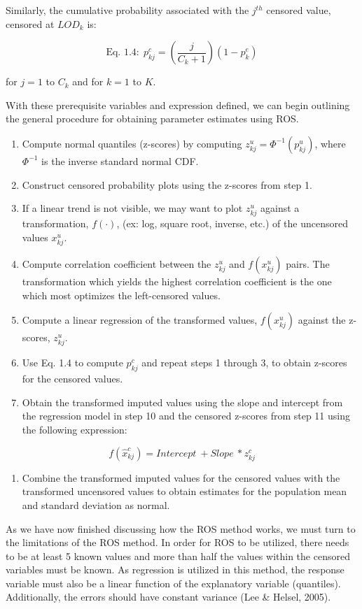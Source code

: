 \documentclass[12pt, twoside]{amherstthesis}
\providecommand{\tightlist}{%
  \setlength{\itemsep}{0pt}\setlength{\parskip}{0pt}}
\begin{document}
Similarly, the cumulative probability associated with the \(j^{th}\) censored value, censored at \(LOD_k\) is:

\[\textrm{Eq. 1.4:} \ \  p^c_{kj} = \left(\frac{j}{C_k+1}\right)(1-p^e_k)\]

for \(j = 1\) to \(C_k\) and for \(k = 1\) to \(K\).

With these prerequisite variables and expression defined, we can begin outlining the general procedure for obtaining parameter estimates using ROS.
\begin{enumerate}
\def\labelenumi{\arabic{enumi}.}
\item
  Compute normal quantiles (z-scores) by computing \(z_{kj}^{u} = \Phi^{-1}(p^u_{kj})\), where \(\Phi^{-1}\) is the inverse standard normal CDF.
\item
  Construct censored probability plots using the z-scores from step 1.
\item
  If a linear trend is not visible, we may want to plot \(z_{kj}^{u}\) against a transformation, \(f(\cdot)\), (ex: log, square root, inverse, etc.) of the uncensored values \(x_{kj}^{u}\).
\item
  Compute correlation coefficient between the \(z_{kj}^{u}\) and \(f(x_{kj}^{u})\) pairs. The transformation which yields the highest correlation coefficient is the one which most optimizes the left-censored values.
\item
  Compute a linear regression of the transformed values, \(f(x_{kj}^{u})\) against the z-scores, \(z_{kj}^{u}\).
\item
  Use Eq. 1.4 to compute \(p^c_{kj}\) and repeat steps 1 through 3, to obtain z-scores for the censored values.
\item
  Obtain the transformed imputed values using the slope and intercept from the regression model in step 10 and the censored z-scores from step 11 using the following expression:
\end{enumerate}
\[f(\hat{x}_{kj}^c) = {Intercept} \ + Slope \ * z_{kj}^{c}\]
\begin{enumerate}
\def\labelenumi{\arabic{enumi}.}
\setcounter{enumi}{7}
\tightlist
\item
  Combine the transformed imputed values for the censored values with the transformed uncensored values to obtain estimates for the population mean and standard deviation as normal.
\end{enumerate}
As we have now finished discussing how the ROS method works, we must turn to the limitations of the ROS method. In order for ROS to be utilized, there needs to be at least 5 known values and more than half the values within the censored variables must be known. As regression is utilized in this method, the response variable must also be a linear function of the explanatory variable (quantiles). Additionally, the errors should have constant variance (Lee \& Helsel, 2005).
\end{document}
